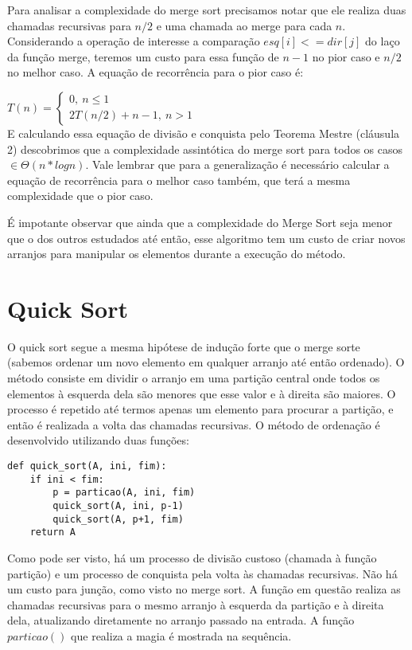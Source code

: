 \documentclass[a4paper, twocolumn]{article}
\theoremstyle{definition}
\begin{document}
Para analisar a complexidade do merge sort precisamos notar que ele realiza duas chamadas recursivas para $n/2$ e uma chamada ao merge para cada $n$. Considerando a operação de interesse a comparação $esq[i] <= dir[j]$ do laço da função merge, teremos um custo para essa função de $n-1$ no pior caso e $n/2$ no melhor caso. A equação de recorrência para o pior caso é:

$T(n) = \begin{cases} 
	0, \ n \leq 1\\
	2T(n/2) + n-1, \ n > 1
\end{cases}$ \\

E calculando essa equação de divisão e conquista pelo Teorema Mestre (cláusula 2) descobrimos que a complexidade assintótica do merge sort para todos os casos  $\in \Theta(n*log n)$. Vale lembrar que para a generalização é necessário calcular a equação de recorrência para o melhor caso também, que terá a mesma complexidade que o pior caso.

É impotante observar que ainda que a complexidade do Merge Sort seja menor que o dos outros estudados até então, esse algoritmo tem um custo de criar novos arranjos para manipular os elementos durante a execução do método.

\section{Quick Sort}
O quick sort segue a mesma hipótese de indução forte que o merge sorte (sabemos ordenar um novo elemento em qualquer arranjo até então ordenado). O método consiste em dividir o arranjo em uma partição central onde todos os elementos à esquerda dela são menores que esse valor e à direita são maiores. O processo é repetido até termos apenas um elemento para procurar a partição, e então é realizada a volta das chamadas recursivas. O método de ordenação é desenvolvido utilizando duas funções:

\begin{lstlisting}[label=quick_sort,caption= Quick Sort]
def quick_sort(A, ini, fim):
    if ini < fim:
        p = particao(A, ini, fim)
        quick_sort(A, ini, p-1)
        quick_sort(A, p+1, fim)
    return A
\end{lstlisting}

Como pode ser visto, há um processo de divisão custoso (chamada à função partição) e um processo de conquista pela volta às chamadas recursivas. Não há um custo para junção, como visto no merge sort. A função em questão realiza as chamadas recursivas para o mesmo arranjo à esquerda da partição e à direita dela, atualizando diretamente no arranjo passado na entrada. A função $particao()$ que realiza a magia é mostrada na sequência.
\end{document}
